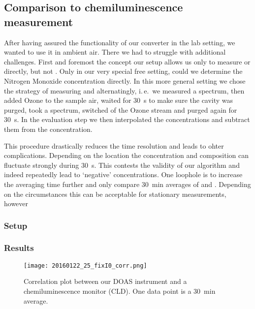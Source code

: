 \subsection{Comparison to chemiluminescence measurement}
\label{sec:cld}

After having assured the functionality of our converter in the lab
setting, we wanted to use it in ambient air. There we had to struggle
with additional challenges. First and foremost the concept our setup
allows us only to measure  or  directly, but not
. Only in our very special  free setting, could we
determine the Nitrogen Monoxide concentration directly. In this more
general setting we chose the strategy of measuring  and
 alternatingly, i.\,e.\ we measured a  spectrum, then
added Ozone to the sample air, waited for \SI{30}{\second} to make
sure the cavity was purged, took a  spectrum, switched of the
Ozone stream and purged again for \SI{30}{\second}. In the evaluation
step we then interpolated the  concentrations and subtract
them from the  concentration. 

This procedure drastically reduces the time resolution and leads to
ohter complications. Depending on the location the 
concentration and composition can fluctuate strongly during
\SI{30}{\second}. This contests the validity of our algorithm and
indeed repeatedly lead to `negative'  concentrations. One
loophole is to increase the averaging time further and only compare
\SI{30}{\minute} averages of  and . Depending on the
circumstances this can be acceptable for stationary measurements, however


\subsubsection{Setup}
\label{sec:cld-setup}

\subsubsection{Results}
\label{sec:cld-results}

\begin{figure}[htbp]
  \centering
  \texttt{[image: 20160122\_25\_fixI0\_corr.png]}
  \caption{Correlation plot between our DOAS instrument and a
    chemiluminescence monitor (CLD). One data point is a
    \SI{30}{\minute} average.}
  \label{fig:cld-corr}
\end{figure}


